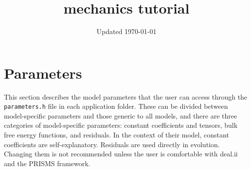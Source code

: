 \documentclass[11pt]{article}
\title{mechanics tutorial}
\date{Updated \today}
\begin{document}
\maketitle


\section{Parameters}
\paragraph{}
This section describes the model parameters that the user can access through the \texttt{parameters.h} file in each application folder.  These can be divided between model-specific parameters and those generic to all models, and there are three categories of model-specific parameters: constant coefficients and tensors, bulk free energy functions, and residuals.  In the context of their model, constant coefficients are self-explanatory.  Residuals are used directly in evolution.  Changing them is not recommended unless the user is comfortable with deal.ii and the PRISMS framework.
\end{document}
